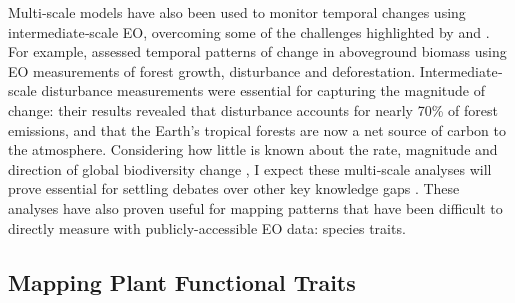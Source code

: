 Multi‐scale models have also been used to monitor temporal changes using intermediate‐scale EO, overcoming some of the challenges highlighted by \cite{Fisher2008-sm} and \cite{Marvin2014-ms}. For example, \cite{Baccini2017-zk} assessed temporal patterns of change in aboveground biomass using EO measurements of forest growth, disturbance and deforestation. Intermediate‐scale disturbance measurements were essential for capturing the magnitude of change: their results revealed that disturbance accounts for nearly 70\% of forest emissions, and that the Earth's tropical forests are now a net source of carbon to the atmosphere. Considering how little is known about the rate, magnitude and direction of global biodiversity change \cite{Pereira2012-vm,mcgill2015fifteen}, I expect these multi‐scale analyses will prove essential for settling debates over other key knowledge gaps \cite{vellend2013global, Gonzalez2016-gh}. These analyses have also proven useful for mapping patterns that have been difficult to directly measure with publicly-accessible EO data: species traits.

\subsection{Mapping Plant Functional Traits}

